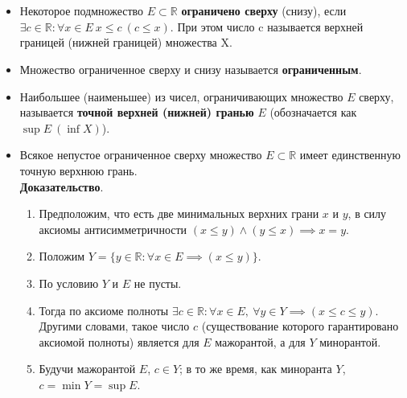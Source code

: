 \documentclass{article}
\begin{document}
\section{\centering}
\noindent{}
\begin{itemize}[leftmargin=*]
    \item
    Некоторое подмножество \(E \subset \mathbb{R}\) \textbf{ограничено сверху} (снизу), если \(\exists c \in \mathbb{R}: \forall x \in E\ x \leq c\ (c \leq x)\). При этом число c называется верхней границей (нижней границей) множества X.\\
    \item Множество ограниченное сверху и снизу называется \textbf{ограниченным}.
    \item
    Наибольшее (наименьшее) из чисел, ограничивающих множество \(E\) сверху, называется \textbf{точной верхней (нижней) гранью} \(E\) (обозначается как \(\sup{E}\ (\inf{X})\)).
    \item
    Всякое непустое ограниченное сверху множество \(E \subset \mathbb{R}\) имеет единственную точную верхнюю грань.\\
    \textbf{Доказательство}.
    \begin{enumerate}
        \item Предположим, что есть две минимальных верхних грани \(x\) и \(y\), в силу аксиомы антисимметричности \((x \leq y) \land (y \leq x) \implies x = y\).
        \item Положим \(Y = \{ y \in \mathbb{R}: \forall x \in E \implies (x \leq y)\}\).
        \item По условию \(Y\) и \(E\) не пусты.
        \item Тогда по аксиоме полноты \(\exists c \in \mathbb{R}: \forall x \in E,\ \forall y \in Y \implies (x \leq c \leq y)\). Другими словами, такое число \(c\) (существование которого гарантировано аксиомой полноты) является для \(E\) мажорантой, а для \(Y\) минорантой. 
        \item Будучи мажорантой \(E\), \(c \in Y\); в то же время, как миноранта \(Y\), \(c = \min{Y} = \sup{E}\).
    \end{enumerate}
\end{itemize}

\end{document}
